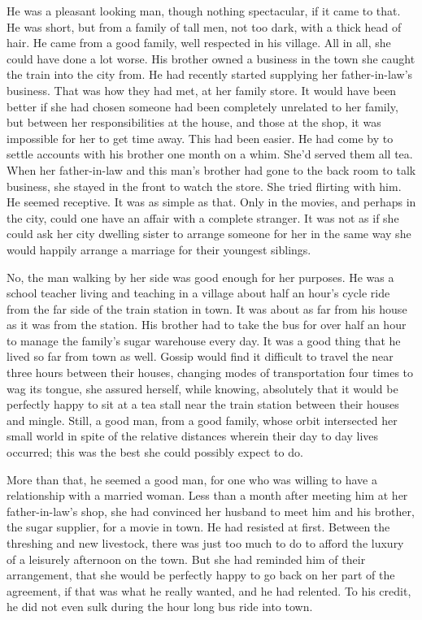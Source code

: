 \documentclass{article}
\begin{document}
He was a pleasant looking man, though nothing spectacular, if it came to that. He was short, but from a family of tall men, not too dark, with a thick head of hair. He came from a good family, well respected in his village. All in all, she could have done a lot worse. His brother owned a business in the town she caught the train into the city from. He had recently started supplying her father-in-law's business. That was how they had met, at her family store. It would have been better if she had chosen someone had been completely unrelated to her family, but between her responsibilities at the house, and those at the shop, it was impossible for her to get time away. This had been easier. He had come by to settle accounts with his brother one month on a whim. She'd served them all tea. When her father-in-law and this man's brother had gone to the back room to talk business, she stayed in the front to watch the store. She tried flirting with him. He seemed receptive. It was as simple as that. Only in the movies, and perhaps in the city, could one have an affair with a complete stranger. It was not as if she could ask her city dwelling sister to arrange someone for her in the same way she would happily arrange a marriage for their youngest siblings. 

No, the man walking by her side was good enough for her purposes. He was a school teacher living and teaching in a village about half an hour's cycle ride from the far side of the train station in town. It was about as far from his house as it was from the station. His brother had to take the bus for over half an hour to manage the family's sugar warehouse every day. It was a good thing that he lived so far from town as well. Gossip would find it difficult to travel the near three hours between their houses, changing modes of transportation four times to wag its tongue, she assured herself, while knowing, absolutely that it would be perfectly happy to sit at a tea stall near the train station between their houses and mingle. Still, a good man, from a good family, whose orbit intersected her small world in spite of the relative distances wherein their day to day lives occurred; this was the best she could possibly expect to do.

More than that, he seemed a good man, for one who was willing to have a relationship with a married woman. Less than a month after meeting him at her father-in-law's shop, she had convinced her husband to meet him and his brother, the sugar supplier, for a movie in town. He had resisted at first. Between the threshing and new livestock, there was just too much to do to afford the luxury of a leisurely afternoon on the town. But she had reminded him of their arrangement, that she would be perfectly happy to go back on her part of the agreement, if that was what he really wanted, and he had relented. To his credit, he did not even sulk during the hour long bus ride into town.
\end{document}
